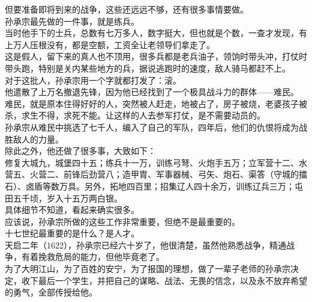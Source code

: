 \begin{multicols}{\theparacolNo}
但要准备即将到来的战争，这些还远远不够，还有很多事情要做。\\

孙承宗最先做的一件事，就是练兵。\\

当时他手下的士兵，总数有七万多人，数字挺大，但也就是个数，一查才发现，有上万人压根没有，都是空额，工资全让老领导们拿走了。\\

这是假人，留下来的真人也不顶用，很多兵都是老兵油子，领饷时带头冲，打仗时带头跑，特别是关内某些地方的兵，据说逃跑时的速度，敌人骑马都赶不上。\\

对于这批人，孙承宗用一个字就都打发了：滚。\\

他遣散了上万名撤退先锋，因为他已经找到了一个极具战斗力的群体——难民。\\

难民，就是原本住得好好的人，突然被人赶走，地被占了，房子被烧，老婆孩子被杀，求生不得，求死不能。让这样的人去参军打仗，是不需要动员的。\\

孙承宗从难民中挑选了七千人，编入了自己的军队，四年后，他们的仇恨将成为战胜敌人的力量。\\

除此之外，他还做了很多事，大致如下：\\

修复大城九，城堡四十五；练兵十一万，训练弓弩、火炮手五万；立军营十二、水营五、火营二、前锋后劲营八；造甲胄、军事器械、弓矢、炮石、渠答（守城的擂石）、卤盾等数万具。另外，拓地四百里；招集辽人四十余万，训练辽兵三万；屯田五千顷，岁入十五万两白银。\\

具体细节不知道，看起来确实很多。\\

应该说，孙承宗所做的这些工作非常重要，但绝不是最重要的。\\

十七世纪最重要的是什么？是人才。\\

天启二年（1622），孙承宗已经六十岁了，他很清楚，虽然他熟悉战争，精通战争，有着挽救危局的能力，但他毕竟老了。\\

为了大明江山，为了百姓的安宁，为了报国的理想，做了一辈子老师的孙承宗决定，收下最后一个学生，并把自己的谋略、战法、无畏的信念，以及永不放弃希望的勇气，全部传授给他。\\


\end{multicols}

